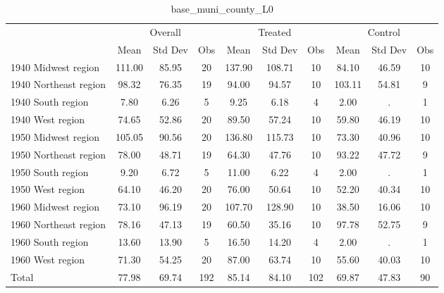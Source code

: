 \begin{table}[htbp]\centering
\def\sym#1{\ifmmode^{#1}\else\(^{#1}\)\fi}
\caption{base\_muni\_county\_L0 \label{tab1}}
\begin{tabular}{l*{3}{ccc}}
\toprule
                    &\multicolumn{3}{c}{Overall}           &\multicolumn{3}{c}{Treated}           &\multicolumn{3}{c}{Control}           \\
                    &        Mean&     Std Dev&         Obs&        Mean&     Std Dev&         Obs&        Mean&     Std Dev&         Obs\\
\midrule
1940 Midwest region &      111.00&       85.95&          20&      137.90&      108.71&          10&       84.10&       46.59&          10\\
1940 Northeast region&       98.32&       76.35&          19&       94.00&       94.57&          10&      103.11&       54.81&           9\\
1940 South region   &        7.80&        6.26&           5&        9.25&        6.18&           4&        2.00&           .&           1\\
1940 West region    &       74.65&       52.86&          20&       89.50&       57.24&          10&       59.80&       46.19&          10\\
1950 Midwest region &      105.05&       90.56&          20&      136.80&      115.73&          10&       73.30&       40.96&          10\\
1950 Northeast region&       78.00&       48.71&          19&       64.30&       47.76&          10&       93.22&       47.72&           9\\
1950 South region   &        9.20&        6.72&           5&       11.00&        6.22&           4&        2.00&           .&           1\\
1950 West region    &       64.10&       46.20&          20&       76.00&       50.64&          10&       52.20&       40.34&          10\\
1960 Midwest region &       73.10&       96.19&          20&      107.70&      128.90&          10&       38.50&       16.06&          10\\
1960 Northeast region&       78.16&       47.13&          19&       60.50&       35.16&          10&       97.78&       52.75&           9\\
1960 South region   &       13.60&       13.90&           5&       16.50&       14.20&           4&        2.00&           .&           1\\
1960 West region    &       71.30&       54.25&          20&       87.00&       63.74&          10&       55.60&       40.03&          10\\
Total               &       77.98&       69.74&         192&       85.14&       84.10&         102&       69.87&       47.83&          90\\
\bottomrule
\end{tabular}
\end{table}
